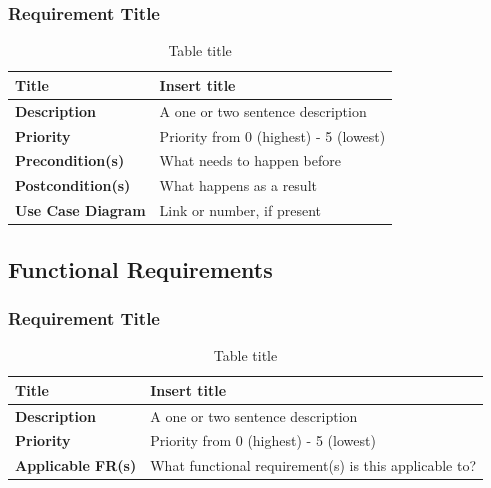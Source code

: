 \documentclass{article}
\begin{document}
\subsubsection{Requirement Title}

\begin{table}[H]
	\caption{Table title}
	\begin{tabularx}{\textwidth}{|l|X|}
		\hline
		\textbf{Title}            & Insert title                           \\ \hline
		\textbf{Description}      & A one or two sentence description      \\ \hline
		\textbf{Priority}         & Priority from 0 (highest) - 5 (lowest) \\ \hline
		\textbf{Precondition(s)}  & What needs to happen before            \\ \hline
		\textbf{Postcondition(s)} & What happens as a result               \\ \hline
		\textbf{Use Case Diagram} & Link or number, if present             \\  \hline
	\end{tabularx}
\end{table}

\subsection{Functional Requirements}

\subsubsection{Requirement Title}

\begin{table}[H]
	\caption{Table title}
	\begin{tabularx}{\textwidth}{|l|X|}
		\hline
		\textbf{Title}            & Insert title                                          \\ \hline
		\textbf{Description}      & A one or two sentence description                     \\ \hline
		\textbf{Priority}         & Priority from 0 (highest) - 5 (lowest)                \\ \hline
		\textbf{Applicable FR(s)} & What functional requirement(s) is this applicable to? \\ \hline
	\end{tabularx}
\end{table}
\end{document}
